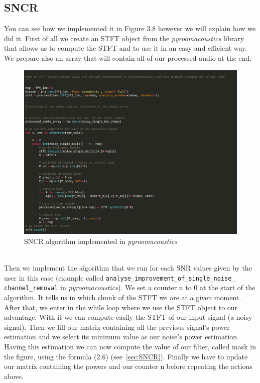 \documentclass[11pt,a4paper,titlepage]{report}
\begin{document}
\subsection{SNCR}
\hspace*{0.6cm}
You can see how we implemented it in Figure 3.8 however we will explain how we did it.
First of all we create an STFT object from the \emph{pyroomacoustics} library that allows us to compute the STFT and to use it in an easy and efficient way. We prepare also an array that will contain all of our processed audio at the end.\\
\begin{figure}[h!]
	\centering
	\includegraphics[width=0.7\linewidth]{rapport11}
	\caption{SNCR algorithm implemented in \textit{pyroomacoustics}}
	\label{fig:rapport14}
\end{figure}\\
Then we implement the algorithm that we run for each SNR values given by the user in this case (example called \texttt{analyse\_improvement\_of\_single\_noise\_\\channel\_removal} in \textit{pyroomacoustics}). We set a counter n to 0 at the start of the algorithm. It tells us in which chunk of the STFT we are at a given moment. After that, we enter in the while loop where we use the STFT object to our advantage. With it we can compute easily the STFT of our input signal (a noisy signal). Then we fill our matrix containing all the previous signal's power estimation and we select its minimum value as our noise's power estimation. Having this estimation we can now compute the value of our filter, called mask in the figure, using the formula (2.6) (see~\ref{sec:SNCR}). Finally we have to update our matrix containing the powers and our counter n before repeating the actions above.\\
\end{document}
